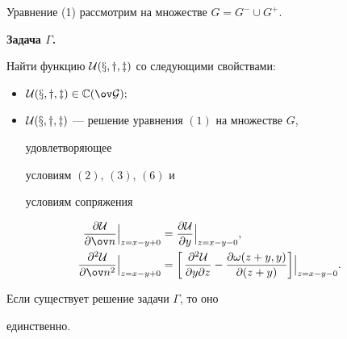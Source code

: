  


Уравнение (1) рассмотрим на множестве $G=G^-\cup G^+$. 


\medskip 


 


{\bf Задача $\Gamma$.} {\it 


Найти функцию $\cal U(x,y,z)$ со следующими свойствами$:$ 


\begin{itemize} 


\item[1)] $\cal U(x,y,z)\in\Bbb C(\ov G);$ 


\item[2)] $\cal U(x,y,z)$ --- решение уравнения $(1)$ на множестве $G$, 


удовлетворяющее 


условиям $(2)$, $(3)$, $(6)$ и 


условиям сопряжения 


\end{itemize}


}


\begin{align} 


\frac{\partial\cal U}{\partial\ov n}\Big|_{z=x-y+0}&= 


\frac{\partial\cal U}{\partial y}\Big|_{z=x-y-0}, \\ 


\frac{\partial^2\cal U}{\partial\ov n^2}\Big|_{z=x-y+0}&= 


\bigg[\,\frac{\partial^2\cal U}{\partial y\partial z}- 


\frac{\partial\omega(z+y,y)}{\partial(z+y)}\bigg] 


\Big|_{z=x-y-0}. 


\end{align} 


 


\begin{thm} Если существует решение задачи $\Gamma$, то оно 


единственно. 


\end{thm} 


 


